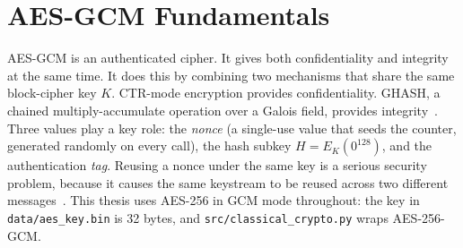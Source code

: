 \documentclass[12pt,a4paper,twoside]{report}
\numberwithin{equation}{chapter}
\begin{document}
\section{AES-GCM Fundamentals}
\label{sec:aesgcm}
AES-GCM is an authenticated cipher. It gives both confidentiality and
integrity at the same time. It does this by combining two mechanisms
that share the same block-cipher key $K$. CTR-mode encryption provides
confidentiality. GHASH, a chained multiply-accumulate operation over a
Galois field, provides integrity~\cite{nist80038d}. Three values play a
key role: the \emph{nonce} (a single-use value that seeds the counter,
generated randomly on every call), the hash subkey $H = E_K(0^{128})$,
and the authentication \emph{tag}. Reusing a nonce under the same key is
a serious security problem, because it causes the same keystream to be
reused across two different messages~\cite{nist80038d}. This thesis uses
AES-256 in GCM mode throughout: the key in \texttt{data/aes\_key.bin} is
32 bytes, and \texttt{src/classical\_crypto.py} wraps AES-256-GCM.
\end{document}

